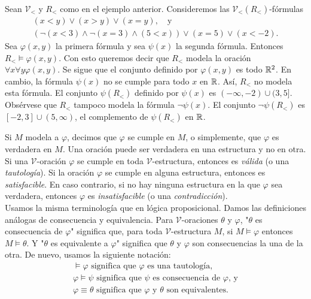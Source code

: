 \documentclass[12pt,a4paper]{book}
\newcommand{\comillas}[1]{"#1"}
\newcommand{\VV}{\mathcal{V}}
\begin{document}
    \begin{ejemplo}\label{ej:conjunto-definible-orden}
        Sean $\VV_{<}$ y $R_{<}$ como en el ejemplo anterior. Consideremos las $\VV_{<}(R_{<})$-fórmulas
        \begin{gather*}
            (x<y)\vee(x>y)\vee(x=y),\quad\text{y}\\
            (\neg(x<3)\wedge\neg(x=3)\wedge(5<x))\vee(x=5)\vee(x<-2).
        \end{gather*}
        Sea $\varphi(x,y)$ la primera fórmula y sea $\psi(x)$ la segunda fórmula. Entonces $R_{<}\models\varphi(x,y)$. Con
        esto queremos decir que $R_{<}$ modela la oración $\forall x\forall y\varphi(x,y)$. Se sigue que el conjunto
        definido por $\varphi(x,y)$ es todo $\mathbb{R}^{2}$. En cambio, la fórmula $\psi(x)$ no se cumple para todo $x$ en $\mathbb{R}$.
        Así, $R_{<}$ no modela esta fórmula. El conjunto $\psi(R_{<})$ definido por $\psi(x)$ es $(-\infty,-2)\cup(3,5]$.
        Obsérvese que $R_{<}$ tampoco modela la fórmula $\neg\psi(x)$. El conjunto $\neg\psi(R_{<})$ es $[-2,3]\cup(5,\infty)$,
        el complemento de $\psi(R_{<})$ en $\mathbb{R}$.
    \end{ejemplo}

    Si $M$ modela a $\varphi$, decimos que $\varphi$ se cumple en $M$, o simplemente, que $\varphi$ es verdadera en $M$.
    Una oración puede ser verdadera en una estructura y no en otra. Si una $\VV$-oración $\varphi$ se cumple en toda
    $\VV$-estructura, entonces es \textit{válida} (o una \textit{tautología}). Si la oración $\varphi$ se cumple en alguna
    estructura, entonces es \textit{satisfacible}. En caso contrario, si no hay ninguna estructura en la que $\varphi$ sea
    verdadera, entonces $\varphi$ es \textit{insatisfacible} (o una \textit{contradicción}).\\
    Usamos la misma terminología que en lógica proposicional. Damos las definiciones análogas de consecuencia y
    equivalencia. Para $\VV$-oraciones $\theta$ y $\varphi$, \comillas{$\theta$ es consecuencia de $\varphi$} significa
    que, para toda $\VV$-estructura $M$, si $M\models\varphi$ entonces $M\models\theta$. Y \comillas{$\theta$ es
    equivalente a $\varphi$} significa que $\theta$ y $\varphi$ son consecuencias la una de la otra. De nuevo, usamos la
    siguiente notación:
    \begin{gather*}
        \models\varphi\text{ significa que $\varphi$ es una tautología,}\\
        \varphi\models\psi\text{ significa que $\psi$ es consecuencia de $\varphi$, y}\\
        \varphi\equiv\theta\text{ significa que $\varphi$ y $\theta$ son equivalentes.}
    \end{gather*}
\end{document}
